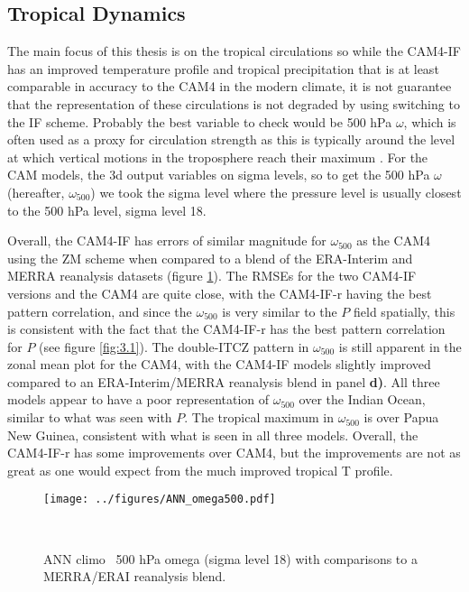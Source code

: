 \documentclass[letterpaper,12pt,titlepage,oneside,final]{book}
\begin{document}
\subsection{Tropical Dynamics}
The main focus of this thesis is on the tropical circulations so while the CAM4-IF has an improved temperature profile and tropical precipitation that is at least comparable in accuracy to the CAM4 in the modern climate, it is not guarantee that the representation of these circulations is not degraded by using switching to the IF scheme. Probably the best variable to check would be 500 hPa $\omega$, which is often used as a proxy for circulation strength as this is typically around the level at which vertical motions in the troposphere reach their maximum \citep{vecchi_global_2007}. For the CAM models, the 3d output variables on sigma levels, so to get the 500 hPa $\omega$ (hereafter, $\omega_{500}$) we took the sigma level where the pressure level is usually closest to the 500 hPa level, sigma level 18.

Overall, the CAM4-IF has errors of similar magnitude for $\omega_{500}$ as the CAM4 using the ZM scheme when compared to a blend of the ERA-Interim and MERRA reanalysis datasets (figure \ref{fig:omega}). The RMSEs for the two CAM4-IF versions and the CAM4 are quite close, with the CAM4-IF-r having the best pattern correlation, and since the $\omega_{500}$ is very similar to the $P$ field spatially, this is consistent with the fact that the CAM4-IF-r has the best pattern correlation for $P$ (see figure \ref{fig:3.1}). The double-ITCZ pattern in $\omega_{500}$ is still apparent in the zonal mean plot for the CAM4, with the CAM4-IF models slightly improved compared to an ERA-Interim/MERRA reanalysis blend in panel \textbf{d)}. All three models appear to have a poor representation of $\omega_{500}$ over the Indian Ocean, similar to what was seen with $P$. The tropical maximum in $\omega_{500}$ is over Papua New Guinea, consistent with what is seen in all three models. Overall, the CAM4-IF-r has some improvements over CAM4, but the improvements are not as great as one would expect from the much improved tropical T profile.
\begin{figure}[H]
\centering
\noindent\texttt{[image: ../figures/ANN\_omega500.pdf]}\hfill
\caption{ANN climo ~500 hPa omega (sigma level 18) with comparisons to a MERRA/ERAI reanalysis blend.}\
\label{fig:omega}
\end{figure}
\end{document}
